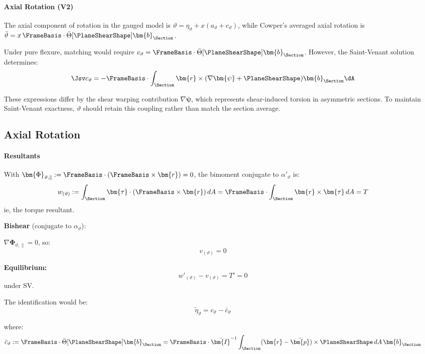 \paragraph{Axial Rotation (V2)}

The axial component of rotation in the gauged model is
\(\vartheta = \eta_\vartheta + x(a_\vartheta + c_\vartheta)\), while
Cowper's averaged axial rotation is 
\(\bar{\vartheta} = x\,\FrameBasis\cdot\bar{\Theta}[\PlaneShearShape]\bm{b}_{\Section}\).

Under pure flexure, matching would require
\(c_\vartheta = \FrameBasis\cdot\bar{\Theta}[\PlaneShearShape]\bm{b}_{\Section}\).
However, the Saint-Venant solution determines:
\[
\Jsv c_\vartheta = -\FrameBasis\cdot\int_{\Section} \bm{r}\times(\nabla\bm{\psi} + \PlaneShearShape)\bm{b}_{\Section} \dA
\]

These expressions differ by the shear warping contribution
\(\nabla\bm{\psi}\), which represents shear-induced torsion in
asymmetric sections. 
To maintain Saint-Venant exactness, \(\vartheta\)
should retain this coupling rather than match the section average.


\subsection{Axial Rotation}

\paragraph{Resultants}

With \(\bm{\Phi}_{\vartheta,\parallel} := \FrameBasis\cdot(\FrameBasis\times\bm{r}) = 0\),
the bimoment conjugate to \(\alpha'_\vartheta\) is:
\[
w_{(\vartheta)} := \int_{\Section} \bm{\tau}\cdot(\FrameBasis\times\bm{r})\,dA = \FrameBasis\cdot\int_{\Section} \bm{r}\times\bm{\tau}\,dA = T
\]
ie, the torque resultant.

\textbf{Bishear} (conjugate to \(\alpha_\vartheta\)):

\(\nabla\bm{\Phi}_{\vartheta,\parallel} = 0\), so:
\[
v_{(\vartheta)} = 0
\]

\textbf{Equilibrium:} 
\[
w'_{(\vartheta)} - v_{(\vartheta)} = T' = 0
\]
under SV.

The identification would be:
\[\tilde{\eta}_\vartheta = c_\vartheta - \bar{c}_{\vartheta}\]

where:
\[\bar{c}_{\vartheta} := \FrameBasis\cdot\bar{\Theta}[\PlaneShearShape]\bm{b}_{\Section} = \FrameBasis\cdot\bar{\bm{I}}^{-1}\int_{\Section} (\bm{r}-\bar{\bm{p}})\times\PlaneShearShape\,dA\,\bm{b}_{\Section}\]

